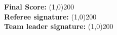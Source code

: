 \begin{flushleft}

\vspace{0.4cm}
\textbf{Final Score:} \line(1,0){200} \\
\vspace{0.4cm}
\textbf{Referee signature:} \line(1,0){200} \\
\vspace{0.4cm}
\textbf{Team leader signature:} \line(1,0){200}
\end{flushleft}
